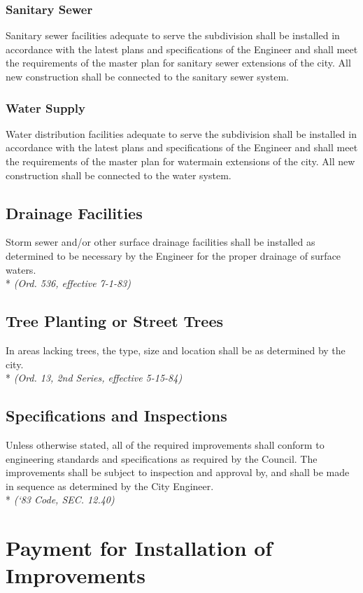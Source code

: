 \subsubsection{Sanitary Sewer}
Sanitary sewer facilities adequate to serve the subdivision shall be installed in accordance with the latest plans and specifications of the Engineer and shall meet the requirements of the master plan for sanitary sewer extensions of the city. All new construction shall be connected to the sanitary sewer system.
\subsubsection{Water Supply}
Water distribution facilities adequate to serve the subdivision shall be installed in accordance with the latest plans and specifications of the Engineer and shall meet the requirements of the master plan for watermain extensions of the city. All new construction shall be connected to the water system.
\subsection{Drainage Facilities}
Storm sewer and/or other surface drainage facilities shall be installed as determined to be necessary by the Engineer for the proper drainage of surface waters.\\*
\emph{(Ord. 536, effective 7-1-83)}
\subsection{Tree Planting or Street Trees}
In areas lacking trees, the type, size and location shall be as determined by the city.\\*
\emph{(Ord. 13, 2nd Series, effective 5-15-84)}
\subsection{Specifications and Inspections}
Unless otherwise stated, all of the required improvements shall conform to engineering standards and specifications as required by the Council. The improvements shall be subject to inspection and approval by, and shall be made in sequence as determined by the City Engineer.\\*
\emph{(‘83 Code, SEC. 12.40)}
\section{Payment for Installation of Improvements}
